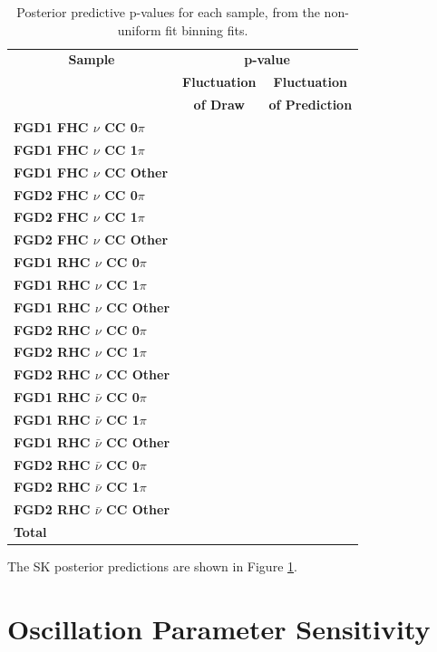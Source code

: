 \begin{center}
\begin{table}
\center
\begin{tabular}{l||c c}
\hline \hline
\multicolumn{1}{c||}{\textbf{Sample}} & \multicolumn{2}{c}{\textbf{p-value}} \\
& \multicolumn{1}{c}{\textbf{Fluctuation}} & \multicolumn{1}{c}{\textbf{Fluctuation}} \\
& \multicolumn{1}{c}{\textbf{of Draw}} & \multicolumn{1}{c}{\textbf{of Prediction}} \\
\hline\hline
\textbf{FGD1 FHC $\nu$ CC 0$\pi$} & & \\ 
\textbf{FGD1 FHC $\nu$ CC 1$\pi$} & & \\
\textbf{FGD1 FHC $\nu$ CC Other} & & \\ \hline
\textbf{FGD2 FHC $\nu$ CC 0$\pi$} & & \\
\textbf{FGD2 FHC $\nu$ CC 1$\pi$} & & \\ 
\textbf{FGD2 FHC $\nu$ CC Other} & & \\ \hline
\textbf{FGD1 RHC $\nu$ CC 0$\pi$} & & \\
\textbf{FGD1 RHC $\nu$ CC 1$\pi$} & & \\
\textbf{FGD1 RHC $\nu$ CC Other} & & \\ \hline
\textbf{FGD2 RHC $\nu$ CC 0$\pi$} & & \\
\textbf{FGD2 RHC $\nu$ CC 1$\pi$} & & \\
\textbf{FGD2 RHC $\nu$ CC Other} & & \\ \hline
\textbf{FGD1 RHC $\bar{\nu}$ CC 0$\pi$} & & \\
\textbf{FGD1 RHC $\bar{\nu}$ CC 1$\pi$} & & \\
\textbf{FGD1 RHC $\bar{\nu}$ CC Other} & & \\
\textbf{FGD2 RHC $\bar{\nu}$ CC 0$\pi$} & & \\
\textbf{FGD2 RHC $\bar{\nu}$ CC 1$\pi$} & & \\
\textbf{FGD2 RHC $\bar{\nu}$ CC Other} & & \\ \hline
\textbf{Total} & & \\ \hline\hline
\end{tabular}
\caption{Posterior predictive p-values for each sample, from the non-uniform fit binning fits.}
\label{tab:polypval}
\end{table}
\end{center}

The SK posterior predictions are shown in Figure \ref{}. %

\section{Oscillation Parameter Sensitivity}

\newpage
